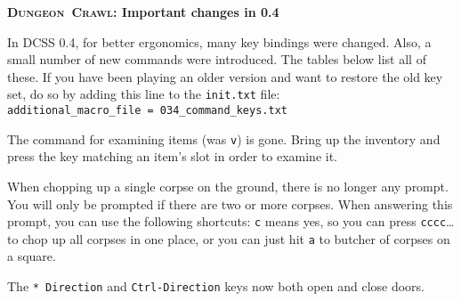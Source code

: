 \documentclass[a4paper,10pt]{article}
\newcommand{\key}[1]{{\texttt{#1}}} %
\newcommand{\crawl}{\textsc{Crawl}}
\newcommand{\dungeon}{\textsc{Dungeon}}
\newcommand{\para}{\vspace{1.5ex}}
\begin{document}
\begin{center}\textbf{\LARGE
\dungeon\ \crawl: Important changes in 0.4
}\end{center}

In DCSS 0.4, for better ergonomics, many key bindings were changed. Also,
a small number of new commands were introduced. The tables below list all 
of these. If you have been playing an older version and want to restore 
the old key set, do so by adding this line to the 
\texttt{init.txt} file: \\
\verb$additional_macro_file = 034_command_keys.txt$ 

\para

The command for examining items (was \key{v}) is gone. Bring up the
inventory and press the key matching an item's slot in order to examine it.

When chopping up a single corpse on the ground, there is no longer any
prompt. You will only be prompted if there are two or more corpses. When
answering this prompt, you can use the following shortcuts: \key{c} means 
yes, so you can press \key{cccc}\dots to chop up all corpses in one place,
or you can just hit \key{a} to butcher of corpses on a square.

The \key{* Direction} and \key{Ctrl-Direction} keys now both open and close
doors.

\para\para
\end{document}
